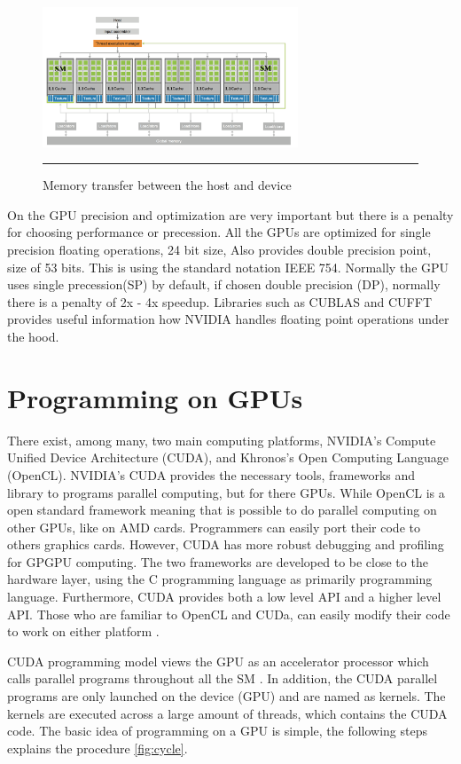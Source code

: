\begin{figure}[htbp]
	\centering
		\includegraphics[width=0.68\textwidth]{Figures/arch.png}
		\rule{35em}{0.5pt}
	\caption[Host and Device]{Memory transfer between the host and device}
	\label{fig:arch}
\end{figure}

On the GPU precision and optimization are very important but there is a penalty for choosing performance or precession. All the GPUs are optimized for single precision floating operations, 24 bit size, Also provides double precision point, size of  53 bits. This is using the standard notation IEEE 754. Normally the GPU uses single precession(SP) by default, if chosen double precision (DP), normally there is a penalty of 2x - 4x speedup\cite{precision}. Libraries such as CUBLAS and CUFFT provides useful information how NVIDIA handles floating point operations under the hood.

\section{Programming on GPUs}

There exist, among many, two main computing platforms, NVIDIA's Compute Unified Device Architecture (CUDA), and Khronos's Open Computing Language (OpenCL). NVIDIA's CUDA provides the necessary tools, frameworks and library to programs parallel computing, but for there GPUs. While OpenCL is a open standard framework meaning that is possible to do parallel computing on other GPUs, like on AMD cards. Programmers can easily port their code to others graphics cards.  However, CUDA has more robust debugging and profiling for GPGPU computing. The two frameworks are developed to be close to the hardware layer, using the C programming language as primarily programming language. Furthermore, CUDA provides both a low level API and a higher level API. Those who are familiar to OpenCL and CUDa, can easily modify their code to work on either platform \cite{hwu}.

CUDA programming model views the GPU as an accelerator processor which calls parallel programs throughout all the SM \cite{handbook}. In addition, the CUDA parallel programs are only launched on the device (GPU) and are named as kernels. The kernels are executed across a large amount of threads, which contains the CUDA code. The basic idea of programming on a GPU is simple, the following steps explains the procedure \ref{fig:cycle}.

